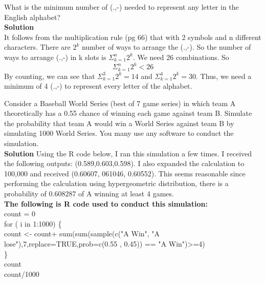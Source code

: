 \documentclass[12pt]{article}
\newenvironment{problem}[2][Problem]{\begin{trivlist}
\item[\hskip \labelsep {\bfseries #1}\hskip \labelsep {\bfseries #2.}]}{\end{trivlist}}
\begin{document}
\begin{problem}{2.6.12} What is the minimum number of (.,-) needed to represent any letter in the English alphabet? \\
\textbf{Solution} \\
It follows from the multiplication rule (pg 66) that with 2 symbols and n different characters. There are $2^k$ number of ways to arrange the (.,-). So the number of ways to arrange (.,-) in k slots is $\Sigma_{k=1}^{n} 2^k$. We need 26 combinations. So $$\Sigma_{k=1}^{n} 2^k < 26 $$ By counting, we can see that $\Sigma_{k=1}^{3} 2^k = 14 $ and $\Sigma_{k=1}^{4} 2^k = 30$. Thus, we need a minimum of 4 (.,-) to represent every letter of the alphabet. 
\end{problem}

\begin{problem}{Module 2 simulation}Consider a Baseball World Series (best of 7 game series) in which team A theoretically
has a 0.55 chance of winning each game against team B. Simulate the probability that team A
would win a World Series against team B by simulating 1000 World Series. You many use any
software to conduct the simulation.  \\

\textbf{Solution} Using the R code below, I ran this simulation a few times. I received the following outputs: (0.589,0.603,0.598). I also expanded the calculation to 100,000 and received (0.60607, 061046, 0.60552). This seems reasonable since performing the calculation using hypergeometric distribution, there is a probability of 0.608287 of A winning at least 4 games.  \\
\textbf{The following is R code used to conduct this simulation:}\\
count = 0\\
for ( i in 1:1000) \{ \\
 count <- count+ sum(sum(sample(c("A Win", "A lose"),7,replace=TRUE,prob=c(0.55 , 0.45)) == "A Win")>=4)\\
\} \\
count \\ 
count/1000 \\

\end{problem}
 
\end{document}
